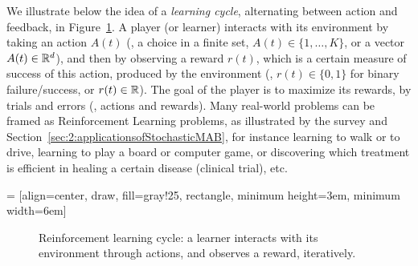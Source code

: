 We illustrate below the idea of a \emph{learning cycle}, alternating between action and feedback,
in Figure~\ref{fig:1:ReinforcementLearningCycle}.
A player (or learner) interacts with its environment by taking an action $A(t)$ (\eg, a choice in a finite set, $A(t)\in\{1,\dots,K\}$, or a vector $A(t)\in\mathbb{R}^d$), and then by observing a reward $r(t)$, which is a certain measure of success of this action, produced by the environment (\eg, $r(t)\in\{0,1\}$ for binary failure/success, or $r(t)\in\mathbb{R}$).
The goal of the player is to maximize its rewards, by trials and errors (\ie, actions and rewards).
Many real-world problems can be framed as Reinforcement Learning problems, as illustrated by the survey \cite{bouneffouf2019survey} and Section~\ref{sec:2:applicationsofStochasticMAB}, for instance learning to walk or to drive, learning to play a board or computer game, or discovering which treatment is efficient in healing a certain disease (clinical trial), etc.


 = [align=center, draw, fill=gray!25, rectangle, minimum height=3em, minimum width=6em]
\begin{figure}[h!]
    \centering
\caption{Reinforcement learning cycle: a learner interacts with its environment through actions, and observes a reward, iteratively.}
\label{fig:1:ReinforcementLearningCycle}
\end{figure}


